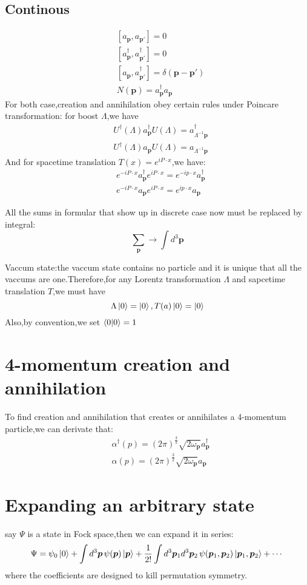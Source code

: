 \documentclass[a4paper]{article}
\begin{document}
\subsection{Continous}
\begin{align*}
	&[a_{\bm{p}},a_{\bm{p}'}]=0\\
	&[a^{\dagger}_{\bm{p}},a^{\dagger}_{\bm{p}'}]=0\\
	&[a_{\bm{p}},a^{\dagger}_{\bm{p}'}]=\delta(\bm{p}-\bm{p}')\\
	&N(\bm{p})=a^{\dagger}_{\bm{p}}a_{\bm{p}}
\end{align*}
For both case,creation and annihilation obey certain rules under Poincare transformation:
for boost $\Lambda$,we have
\begin{align*}
	&U^{\dagger}(\Lambda)a^{\dagger}_{\bm{p}}U(\Lambda)=a^{\dagger}_{\Lambda^{-1}\bm{p}}\\
	&U^{\dagger}(\Lambda)a_{\bm{p}}U(\Lambda)=a_{\Lambda^{-1}\bm{p}}
\end{align*}
And for spacetime translation $T(x)=e^{iP\cdot x}$,we have:
\begin{align*}
	&e^{-iP\cdot x}a^{\dagger}_{\bm{p}}e^{iP\cdot x}=e^{-ip\cdot x}a^{\dagger}_{\bm{p}}\\
	&e^{-iP\cdot x}a_{\bm{p}}e^{iP\cdot x}=e^{ip\cdot x}a_{\bm{p}}
\end{align*}
\par All the sums in formular that show up in discrete case now must be replaced by integral:$$\underset{\bm{p}}{\sum}\rightarrow\int d^3\bm{p}$$
\par Vaccum state:the vaccum state contains no particle and it is unique that all the vaccums are one.Therefore,for any Lorentz transformation $\Lambda$ and sapcetime translation $T$,we must have $$\Lambda\ket{0}=\ket{0},T(a)\ket{0}=\ket{0}$$
Also,by convention,we set $\braket{0|0}=1$
\section{4-momentum creation and annihilation}
To find creation and annihilation that creates or annihilates a 4-momentum particle,we can derivate that:
\begin{align*}
	&\alpha^{\dagger}(p)=(2\pi)^{\frac{3}{2}}\sqrt{2\omega_{\bm{p}}}a^{\dagger}_{\bm{p}}\\
	&\alpha(p)=(2\pi)^{\frac{3}{2}}\sqrt{2\omega_{\bm{p}}}a_{\bm{p}}
\end{align*}
\section{Expanding an arbitrary state}
say $\Psi$ is a state in Fock space,then we can expand it in series:$$\Psi=\psi_0\ket{0}+\int d^3\bm{p}\,\psi(\bm{p})\ket{\bm{p}}+\frac{1}{2!}\int d^3\bm{p}_1 d^3\bm{p}_2\,\psi(\bm{p}_1,\bm{p}_2)\ket{\bm{p}_1,\bm{p}_2}+\cdots
$$where the coefficients are designed to kill permutation symmetry.
\end{document}
